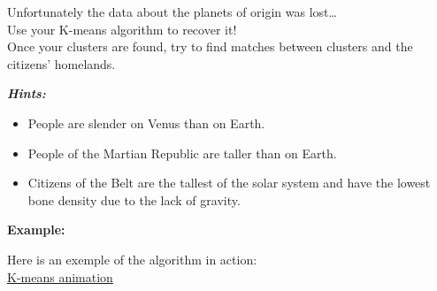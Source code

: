 \documentclass[]{article}
\begin{document}
Unfortunately the data about the planets of origin was lost\ldots{}\\
Use your K-means algorithm to recover it!\\
Once your clusters are found, try to find matches between clusters and
the citizens' homelands.

\textbf{\emph{Hints:}}

\begin{itemize}
\item
  People are slender on Venus than on Earth.
\item
  People of the Martian Republic are taller than on Earth.
\item
  Citizens of the Belt are the tallest of the solar system and have the
  lowest bone density due to the lack of gravity.
\end{itemize}

\textbf{Example:}

Here is an exemple of the algorithm in action:\\
\href{https://i.ibb.co/bKFVVx2/ezgif-com-gif-maker.gif}{K-means
animation}

\clearpage
\end{document}
